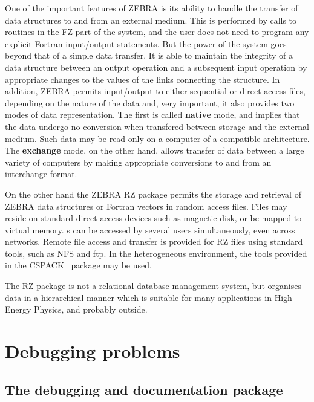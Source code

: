 One of the important features of ZEBRA is its ability to handle the
transfer of data structures to and from an external medium. 
This is performed by calls to routines in the FZ part of the
%
system, and the user does not need to program any explicit Fortran input/output
statements. 
But the power of the system goes beyond that of a simple data transfer. 
It is able to maintain the integrity of a data structure
between an output operation and a subsequent input operation by
appropriate changes to the values of the links connecting the structure. 
In addition, ZEBRA permits input/output to either sequential or direct 
access files, depending on the nature
of the data and, very important, it also provides two modes of data
representation. 
%
The first is called {\bf native} mode, and implies that the data 
undergo no conversion when
transfered between storage and the external medium. Such data may be read
only on a computer of a compatible architecture. 
The {\bf exchange} mode, on the other hand,
%
allows transfer of data between a large variety of
computers by making appropriate conversions to and from an interchange
format.
                                          
On the other hand the ZEBRA RZ package permits the storage and retrieval of 
ZEBRA data structures or Fortran vectors in random access files. 
Files may reside on standard
direct access devices such as magnetic disk, or be
mapped to virtual memory. 
\RZfile s can be accessed by several users simultaneously,
even across networks.
Remote file access and transfer is provided for RZ files
using standard tools, such as NFS and ftp. In the heterogeneous
environment, the tools provided in the CSPACK~\cite{bib-CSPACK} 
package may be used.

The RZ package is not a relational database management system,
but organises data in a hierarchical manner which is suitable
for many applications in High Energy Physics, and probably outside.


\newpage
{}
\section{Debugging problems}
\subsection{The debugging and documentation package}

